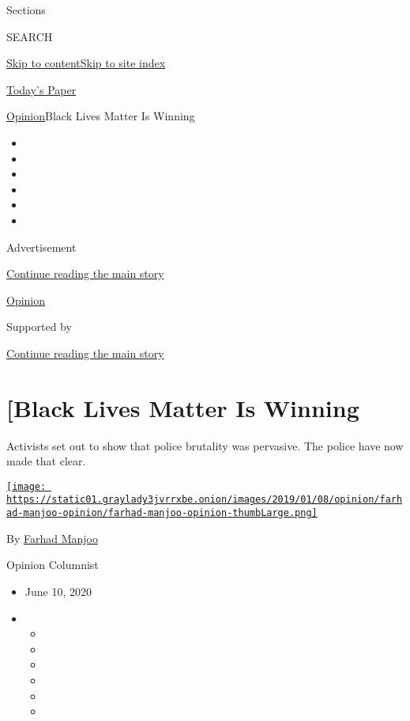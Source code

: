 Sections

SEARCH

\protect\hyperlink{site-content}{Skip to
content}\protect\hyperlink{site-index}{Skip to site index}

\href{https://myaccount.nytimes3xbfgragh.onion/auth/login?response_type=cookie\&client_id=vi}{}

\href{https://www.nytimes3xbfgragh.onion/section/todayspaper}{Today's
Paper}

\href{/section/opinion}{Opinion}\textbar{}{[}Black Lives Matter Is
Winning

\begin{itemize}
\item
\item
\item
\item
\item
\item
\end{itemize}

Advertisement

\protect\hyperlink{after-top}{Continue reading the main story}

\href{/section/opinion}{Opinion}

Supported by

\protect\hyperlink{after-sponsor}{Continue reading the main story}

\hypertarget{black-lives-matter-is-winning}{%
\section{{[}Black Lives Matter Is
Winning}\label{black-lives-matter-is-winning}}

Activists set out to show that police brutality was pervasive. The
police have now made that clear.

\href{https://www.nytimes3xbfgragh.onion/by/farhad-manjoo}{\texttt{[image: https://static01.graylady3jvrrxbe.onion/images/2019/01/08/opinion/farhad-manjoo-opinion/farhad-manjoo-opinion-thumbLarge.png]}}

By \href{https://www.nytimes3xbfgragh.onion/by/farhad-manjoo}{Farhad
Manjoo}

Opinion Columnist

\begin{itemize}
\item
  June 10, 2020
\item
  \begin{itemize}
  \item
  \item
  \item
  \item
  \item
  \item
  \end{itemize}
\end{itemize}

